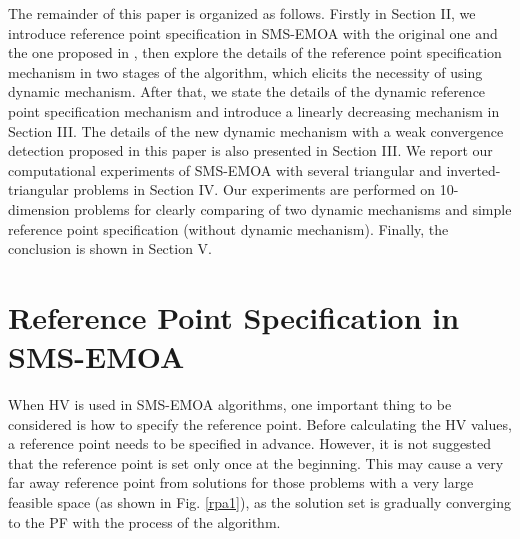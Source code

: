 \documentclass[conference]{IEEEtran}
\begin{document}
The remainder of this paper is organized as follows. 
Firstly in Section II, we introduce reference point specification in SMS-EMOA with
the original one and the one proposed in \cite{hisao:RPhowtoSpecify},
then explore the details of the reference point specification mechanism in two stages of the algorithm, 
which elicits the necessity of using dynamic mechanism.
After that, we state the details of the dynamic reference point specification mechanism and introduce 
a linearly decreasing mechanism in Section III. 
The details of the new dynamic mechanism with a weak convergence detection proposed in this paper is also presented in Section III. 
We report our computational experiments of SMS-EMOA 
with several triangular and inverted-triangular problems in Section IV. Our experiments are performed on
10-dimension problems for clearly comparing of two dynamic mechanisms and 
simple reference point specification (without dynamic mechanism). Finally, the conclusion is shown in Section V.

%
%
\section{Reference Point Specification in SMS-EMOA}
When HV is used in SMS-EMOA algorithms, 
one important thing to be considered is how to specify the reference point.
Before calculating the HV values, a reference point needs to be specified in advance.
However, it is not suggested that the reference point is set only once at the beginning. 
This may cause a very far away reference point from solutions
for those problems with a very large feasible space (as shown in Fig. \ref{rpa1}),
as the solution set is gradually converging to the PF
with the process of the algorithm. 
\end{document}
